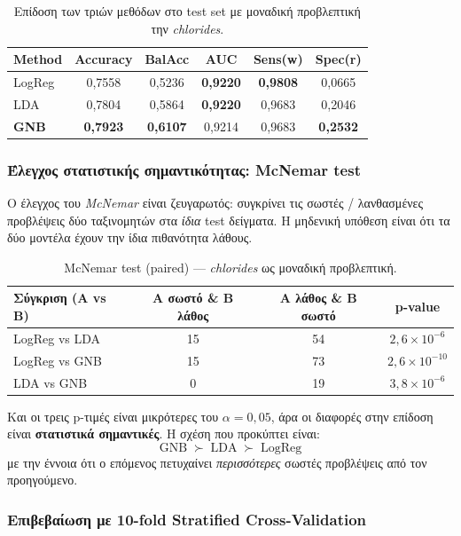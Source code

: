 \documentclass[11pt,a4paper]{article}
\begin{document}
\begin{table}[h!]
\centering
\caption{Επίδοση των τριών μεθόδων στο test set με μοναδική προβλεπτική
την \textit{chlorides}.}
\begin{tabular}{lccccc}
\toprule
Method & Accuracy & BalAcc & AUC & Sens(w) & Spec(r) \\
\midrule
LogReg      & 0,7558 & 0,5236 & \textbf{0,9220} & \textbf{0,9808} & 0,0665 \\
LDA         & 0,7804 & 0,5864 & \textbf{0,9220} & 0,9683 & 0,2046 \\
\textbf{GNB} & \textbf{0,7923} & \textbf{0,6107}
            & 0,9214 & 0,9683 & \textbf{0,2532} \\
\bottomrule
\end{tabular}
\end{table}

\subsubsection*{Έλεγχος στατιστικής σημαντικότητας: McNemar test}

Ο έλεγχος του \textit{McNemar} είναι ζευγαρωτός: συγκρίνει τις σωστές /
λανθασμένες προβλέψεις δύο ταξινομητών στα \emph{ίδια} test δείγματα.
Η μηδενική υπόθεση είναι ότι τα δύο μοντέλα έχουν την ίδια πιθανότητα
λάθους.

\begin{table}[h!]
\centering
\caption{McNemar test (paired) — \textit{chlorides} ως μοναδική
προβλεπτική.}
\begin{tabular}{lccc}
\toprule
Σύγκριση (A vs B) & A σωστό \& B λάθος & A λάθος \& B σωστό & p-value \\
\midrule
LogReg vs LDA   & 15 & 54 & $2{,}6\times 10^{-6}$ \\
LogReg vs GNB   & 15 & 73 & $2{,}6\times 10^{-10}$ \\
LDA    vs GNB   &  0 & 19 & $3{,}8\times 10^{-6}$ \\
\bottomrule
\end{tabular}
\end{table}

Και οι τρεις p-τιμές είναι μικρότερες του $\alpha = 0{,}05$, άρα οι
διαφορές στην επίδοση είναι \textbf{στατιστικά σημαντικές}. Η σχέση
που προκύπτει είναι:
\[
\text{GNB}\;\succ\;\text{LDA}\;\succ\;\text{LogReg}
\]
με την έννοια ότι ο επόμενος πετυχαίνει \emph{περισσότερες} σωστές
προβλέψεις από τον προηγούμενο.

\subsubsection*{Επιβεβαίωση με 10-fold Stratified Cross-Validation}
\end{document}
